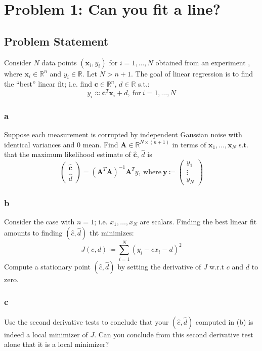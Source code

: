 \documentclass[11pt]{report}
\theoremstyle{definition}
\begin{document}
\section*{Problem 1: Can you fit a line?}
\subsection*{Problem Statement}
Consider $N$ data points $(\mathbf{x}_i, y_i)$ for $i=1,\ldots,N$ obtained from
an experiment , where $\mathbf{x}_i\in\mathbb{R}^n$ and $y_i\in\mathbb{R}$. Let
$N>n+1$. The goal of linear regression is to find the ``best'' linear fit; i.e.
find $\mathbf{c}\in\mathbb{R}^n$, $d\in\mathbb{R}$ s.t.:
\[y_i\approx \mathbf{c}^T\mathbf{x}_i + d,\ \textrm{for}\ i=1,\ldots,N\]

\subsubsection*{a}
Suppose each measurement is corrupted by independent Gaussian noise with
identical variances and 0 mean. Find $\mathbf{A}\in\mathbb{R}^{N\times(n+1)}$ in
terms of $\mathbf{x}_1,\ldots,\mathbf{x}_N$ s.t. that the maximum likelihood
estimate of $\hat{\mathbf{c}}$, $\hat{d}$ is
\[
	\begin{pmatrix}
		\hat{\mathbf{c}} \\
		\hat{d}
	\end{pmatrix}
	=
	\left(\mathbf{A}^T\mathbf{A}\right)^{-1}\mathbf{A}^Ty,\
	\textrm{where}\ \mathbf{y}\coloneqq
	\begin{pmatrix}
		y_1    \\
		\vdots \\
		y_N
	\end{pmatrix}
\]

\subsubsection*{b}
Consider the case with $n=1$; i.e. $x_1,\ldots,x_N$ are scalars. Finding the best linear fit amounts to finding
$(\hat{c}, \hat{d})$ tht minimizes:
\[ J(c,d) \coloneqq \sum_{i=1}^{N}(y_i-cx_i-d)^2 \]
Compute a stationary point $(\hat{c},\hat{d})$ by setting the derivative of $J$ w.r.t $c$ and $d$ to zero.

\subsubsection*{c}
Use the second derivative tests to conclude that your $(\hat{c}, \hat{d})$ computed in (b) is indeed a
local minimizer of $J$. Can you conclude from this second derivative test alone that it is a local minimizer?
\end{document}
